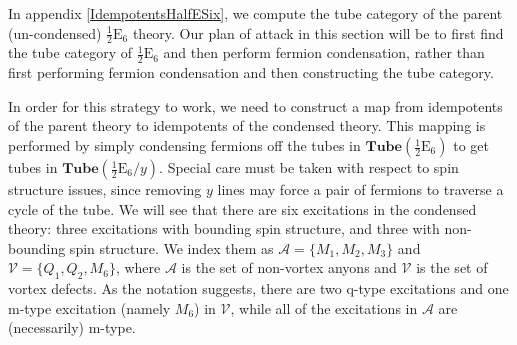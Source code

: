 \documentclass[12pt,a4paper]{article}
\newcommand{\tp}{\otimes}
\newcommand{\mca}{\mathcal{A}}
\newcommand{\mcv}{\mathcal{V}}
\newcommand{\tube}{\textbf{Tube}}
\newcommand{\dave}[1]{{\color{ao(english)}\footnotesize{(DA) #1}}}
\newcommand{\halfesix}{\frac{1}{2}\text{E}_6}
\begin{document}
In appendix \ref{IdempotentsHalfESix}, we compute the tube category of the parent (un-condensed) $\halfesix$ theory. 
Our plan of attack in this section will be to first find the tube category of $\halfesix$ and then perform fermion condensation, rather than first performing fermion condensation and then constructing the tube category. 
 





In order for this strategy to work, we need to construct a map from idempotents of the parent theory to idempotents of the condensed theory.
This mapping is performed by simply condensing fermions off the tubes in $\tube(\halfesix)$ to get tubes in $\tube(\halfesix / y)$. 
Special care must be taken with respect to spin structure issues, since removing $y$ lines may force a pair of fermions to traverse a cycle of the tube. 
We will see that there are six excitations in the condensed theory: three excitations with bounding spin structure, and three with non-bounding spin structure. 
We index them as $\mca = \{ M_1, M_2, M_3\}$ and $\mcv = \{ Q_1, Q_2, M_6 \}$, where $\mca$ is the set of non-vortex anyons and $\mcv$ is the set of vortex defects. 
As the notation suggests, there are two q-type excitations and one m-type excitation (namely $M_6$) in $\mcv$, while all of the excitations in $\mca$ are (necessarily) m-type. 
\end{document}
